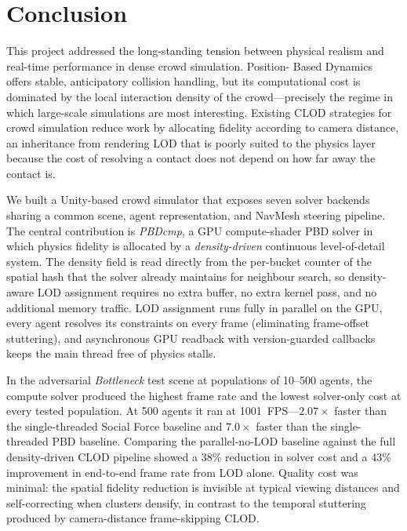 \section{Conclusion}

This project addressed the long-standing tension between physical
realism and real-time performance in dense crowd simulation.  Position-
Based Dynamics offers stable, anticipatory collision handling, but its
computational cost is dominated by the local interaction density of the
crowd---precisely the regime in which large-scale simulations are most
interesting.  Existing CLOD strategies for crowd simulation reduce
work by allocating fidelity according to camera distance, an inheritance
from rendering LOD that is poorly suited to the physics layer because
the cost of resolving a contact does not depend on how far away the
contact is.

We built a Unity-based crowd simulator that exposes seven solver
backends sharing a common scene, agent representation, and NavMesh
steering pipeline.  The central contribution is \textit{PBDcmp}, a
GPU compute-shader PBD solver in which physics fidelity is allocated
by a \emph{density-driven} continuous level-of-detail system.  The
density field is read directly from the per-bucket counter of the
spatial hash that the solver already maintains for neighbour search,
so density-aware LOD assignment requires no extra buffer, no extra
kernel pass, and no additional memory traffic.  LOD assignment runs
fully in parallel on the GPU, every agent resolves its constraints on
every frame (eliminating frame-offset stuttering), and asynchronous
GPU readback with version-guarded callbacks keeps the main thread
free of physics stalls.

In the adversarial \textit{Bottleneck} test scene at populations of
10--500 agents, the compute solver produced the highest frame rate
and the lowest solver-only cost at every tested population.  At 500
agents it ran at 1001~FPS---$2.07\times$ faster than the
single-threaded Social Force baseline and $7.0\times$ faster than the
single-threaded PBD baseline.  Comparing the parallel-no-LOD baseline
against the full density-driven CLOD pipeline showed a 38\% reduction
in solver cost and a 43\% improvement in end-to-end frame rate from
LOD alone.  Quality cost was minimal: the spatial fidelity reduction
is invisible at typical viewing distances and self-correcting when
clusters densify, in contrast to the temporal stuttering produced by
camera-distance frame-skipping CLOD.

